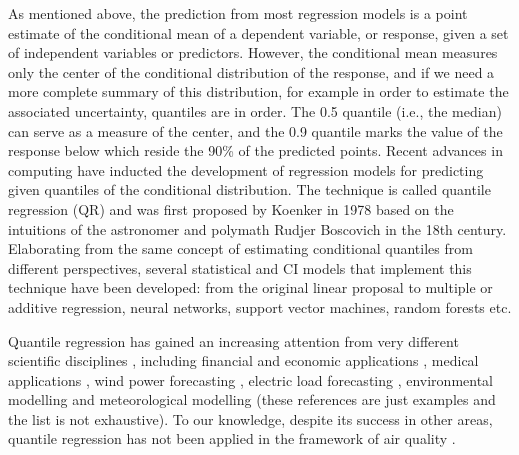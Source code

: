 \documentclass[a4paper,twocolumn,5p]{elsarticle}
\begin{document}
As mentioned above, the prediction from most regression models is a
point estimate of the conditional mean of a dependent variable, or
response, given a set of independent variables or predictors. However,
the conditional mean measures only the center of the conditional
distribution of the response, and if we need a more complete summary
of this distribution, for example in order to estimate the associated
uncertainty, quantiles are in order. The 0.5 quantile (i.e., the
median) can serve as a measure of the center, and the 0.9 quantile
marks the value of the response below which reside the 90\% of the
predicted points. Recent advances in computing have inducted the
development of regression models for predicting given quantiles of the
conditional distribution. The technique is called quantile regression
(QR) and was first proposed by Koenker in 1978
\cite{koenker_regression_1978} based on the intuitions of the
astronomer and polymath Rudjer Boscovich in the 18th
century. Elaborating from the same concept of estimating conditional
quantiles from different perspectives, several statistical and CI
models that implement this technique have been developed: from the
original linear proposal to multiple or additive regression, neural
networks, support vector machines, random forests etc.

Quantile regression has gained an increasing attention from very
different scientific disciplines \cite{yu_quantile_2003}, including
financial and economic applications \cite{fitzenberger_economic_2002},
medical applications \cite{soyiri_forecasting_2012}, wind power
forecasting \cite{zhang_review_2014}, electric load forecasting
\cite{7423794,gibbons_quantile_2014}, environmental modelling
\cite{cade_gentle_2003} and meteorological modelling
\cite{bjornar_bremnes_probabilistic_2004} (these references are just
examples and the list is not exhaustive). To our knowledge, despite
its success in other areas, quantile regression has not been applied
in the framework of air quality%
.
\end{document}
